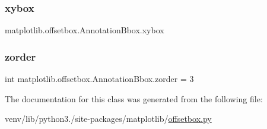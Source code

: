 \subsubsection{\texorpdfstring{xybox}{xybox}}
{\footnotesize\ttfamily matplotlib.\+offsetbox.\+Annotation\+Bbox.\+xybox}

\mbox{\label{classmatplotlib_1_1offsetbox_1_1AnnotationBbox_a28c1e0166d063006bb1bb61e6c68c1fd}} 
\subsubsection{\texorpdfstring{zorder}{zorder}}
{\footnotesize\ttfamily int matplotlib.\+offsetbox.\+Annotation\+Bbox.\+zorder = 3\hspace{0.3cm}{\ttfamily [static]}}



The documentation for this class was generated from the following file\+:\begin{DoxyCompactItemize}
\item 
venv/lib/python3./site-\/packages/matplotlib/\hyperlink{offsetbox_8py}{offsetbox.\+py}\end{DoxyCompactItemize}
